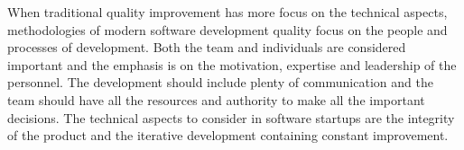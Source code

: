 When traditional quality improvement has more focus on the technical aspects, methodologies of modern software development quality focus on the people and processes of development. Both the team and individuals are considered important and the emphasis is on the motivation, expertise and leadership of the personnel. The development should include plenty of communication and the team should have all the resources and authority to make all the important decisions. The technical aspects to consider in software startups are the integrity of the product and the iterative development containing constant improvement.
